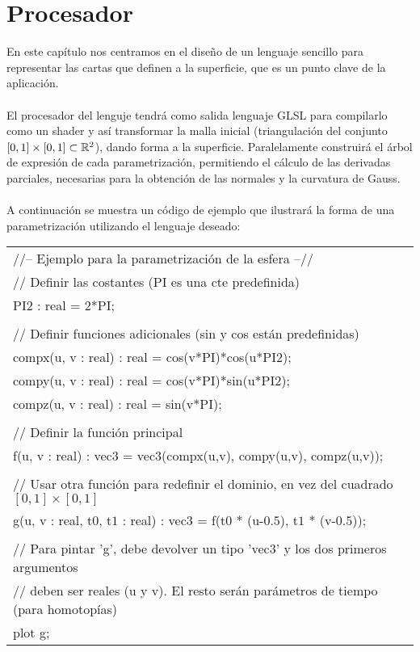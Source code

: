 
\chapter{Procesador}

En este capítulo nos centramos en el diseño de un lenguaje sencillo para representar las cartas que definen a la superficie, que es un punto clave de la aplicación.\\
\\El procesador del lenguje tendrá como salida lenguaje GLSL para compilarlo como un shader y así transformar la malla inicial (triangulación del conjunto $[0,1]\times[0,1] \subset \mathbb{R}^2$), dando forma a la superficie. Paralelamente construirá el árbol de expresión de cada parametrización, permitiendo el cálculo de las derivadas parciales, necesarias para la obtención de las normales y la curvatura de Gauss.\\
\\A continuación se muestra un código de ejemplo que ilustrará la forma de una parametrización utilizando el lenguaje deseado:

\begin{center}
\begin{tabular}{| p{14cm} |}
\hline
//-- Ejemplo para la parametrización de la esfera --//\\
// Definir las costantes (PI es una cte predefinida)\\
PI$2$ : real = $2$*PI;\\
\\
// Definir funciones adicionales (sin y cos están predefinidas)\\
compx(u, v : real) : real = cos(v*PI)*cos(u*PI$2$);\\
compy(u, v : real) : real = cos(v*PI)*sin(u*PI$2$);\\
compz(u, v : real) : real = sin(v*PI);\\
\\
// Definir la función principal\\
f(u, v : real) : vec$3$ = vec$3$(compx(u,v), compy(u,v), compz(u,v));\\
\\
// Usar otra función para redefinir el dominio, en vez del cuadrado $[0,1]\times[0,1]$\\
g(u, v : real, t$0$, t$1$ : real) : vec$3$ = f(t$0$ * (u-$0.5$), t$1$ * (v-$0.5$));\\
\\
//  Para pintar 'g', debe devolver un tipo 'vec$3$' y los dos primeros argumentos \\
// deben ser reales (u y v). El resto serán parámetros de tiempo (para homotopías)\\
plot g;\\
\hline
\end{tabular}
\end{center}

